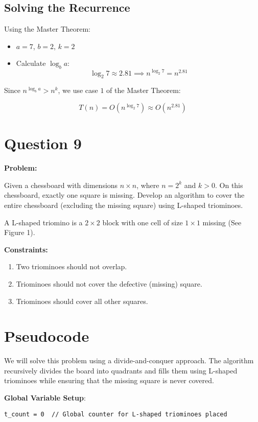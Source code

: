 \documentclass[a4paper,12pt]{report}
\begin{document}
\subsection*{Solving the Recurrence}
Using the Master Theorem:
\begin{itemize}
    \item \(a = 7\), \(b = 2\), \(k = 2\)
    \item Calculate \( \log_b a \):
    \[
    \log_2 7 \approx 2.81 \implies n^{\log_2 7} = n^{2.81}
    \]
\end{itemize}

Since \(n^{\log_b a} > n^k\), we use case \(1\) of the Master Theorem:
\begin{tcolorbox}[colback=white, colframe=black, boxrule=0.5pt]
\[
T(n) = O(n^{\log_2 7}) \approx O(n^{2.81})
\]
\end{tcolorbox}


\section*{Question 9}

\textbf{Problem:}

Given a chessboard with dimensions $n \times n$, where $n = 2^k$ and $k > 0$. On this chessboard, exactly one square is missing. Develop an algorithm to cover the entire chessboard (excluding the missing square) using L-shaped triominoes.

A L-shaped triomino is a $2 \times 2$ block with one cell of size $1 \times 1$ missing (See Figure 1).

\textbf{Constraints:}
\begin{enumerate}
    \item Two triominoes should not overlap.
    \item Triominoes should not cover the defective (missing) square.
    \item Triominoes should cover all other squares.
\end{enumerate}

\section*{Pseudocode}

We will solve this problem using a divide-and-conquer approach. The algorithm recursively divides the board into quadrants and fills them using L-shaped triominoes while ensuring that the missing square is never covered.

\textbf{Global Variable Setup}:
\begin{tcolorbox}[colback=white, colframe=black, boxrule=0.5pt]
\ttfamily\small
\begin{verbatim}
t_count = 0  // Global counter for L-shaped triominoes placed
\end{verbatim}
\end{tcolorbox}
\end{document}
